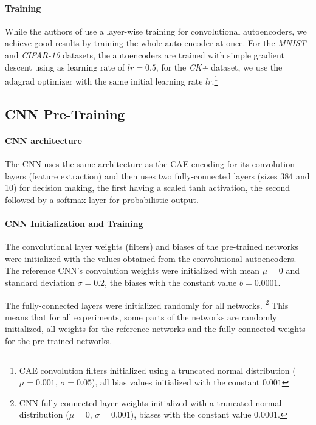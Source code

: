 \documentclass{article}
\begin{document}
    \paragraph{Training} While the authors of \citep{masci2011stacked} use a layer-wise training for convolutional autoencoders, we achieve good results by training the whole auto-encoder at once. 
    For the \emph{MNIST} and \emph{CIFAR-10} datasets, the autoencoders are trained with simple gradient descent using as learning rate of $lr = 0.5$, for the \emph{CK+} dataset, we use the adagrad optimizer with the same initial learning rate $lr$.\footnote{CAE convolution filters initialized using a truncated normal distribution ($\mu = 0.001$, $\sigma = 0.05$), all bias values initialized with the constant $0.001$}

  \subsection{CNN Pre-Training}

    \paragraph{CNN architecture} The CNN uses the same architecture as the CAE encoding for its convolution layers (feature extraction) and then uses two fully-connected layers (sizes 384 and 10) for decision making, the first having a scaled tanh activation, the second followed by a softmax layer for probabilistic output.

    \paragraph{CNN Initialization and Training}

    The convolutional layer weights (filters) and biases of the pre-trained networks were initialized with the values obtained from the convolutional autoencoders. The reference CNN's convolution weights were initialized with mean $\mu = 0 $ and standard deviation $\sigma = 0.2$, the biases with the constant value $b =  0.0001$.

    The fully-connected layers were initialized randomly for all networks. \footnote{CNN fully-connected layer weights initialized with a truncated normal distribution ($\mu = 0$, $\sigma = 0.001$), biases with the constant value $0.0001$.}
    This means that for all experiments, some parts of the networks are randomly initialized, all weights for the reference networks and the fully-connected weights for the pre-trained networks. 
\end{document}

